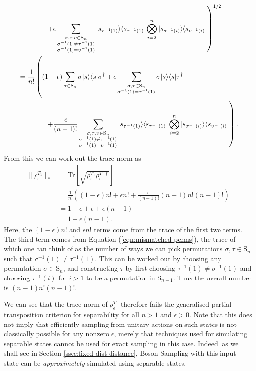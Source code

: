 \begin{align}
&\quad\quad\quad\quad\left.+ \epsilon\sum_{\substack{\sigma,\tau,\upsilon \in \textrm{S}_n\\\sigma^{-1}(1) \neq \tau^{-1}(1)\\\sigma^{-1}(1) = \upsilon^{-1}(1)}}|s_{\tau^{-1}(1)}\rangle\langle s_{\tau^{-1}(1)}|\bigotimes_{i=2}^n|s_{\sigma^{-1}(i)}\rangle\langle s_{\upsilon^{-1}(i)}|\right)^{1/2} \\
&= \frac{1}{n!}\left(\vphantom{\sum_{\substack{a\\b\\c\\d}}}(1-\epsilon)\sum_{\sigma\in \textrm{S}_n}\sigma|s\rangle\langle s|\sigma^\dagger + \epsilon\sum_{\substack{\sigma,\tau \in \textrm{S}_n\\\sigma^{-1}(1) = \tau^{-1}(1)}}\sigma|s\rangle\langle s|\tau^\dagger\right.\nonumber\\
&\quad\quad\quad\quad\left.+\frac{\epsilon}{(n-1)!}\sum_{\substack{\sigma,\tau,\upsilon \in \textrm{S}_n\\\sigma^{-1}(1) \neq \tau^{-1}(1)\\\sigma^{-1}(1) = \upsilon^{-1}(1)}}|s_{\tau^{-1}(1)}\rangle\langle s_{\tau^{-1}(1)}|\bigotimes_{i=2}^n|s_{\sigma^{-1}(i)}\rangle\langle s_{\upsilon^{-1}(i)}|\right).\label{eqn:mismatched-perms}
\end{align}
From this we can work out the trace norm as
\begin{align}
\|\rho_{\epsilon}^{T_1}\|_*
 &= \textrm{Tr}\left[\sqrt{\rho_\epsilon^{T_1}\rho_\epsilon^{T_1\dagger}}\right]\\
 &= \frac{1}{n!}\left((1-\epsilon)n! + \epsilon n! + \frac{\epsilon}{(n-1)!}(n-1)n!(n-1)!\right)\\
 &= 1-\epsilon + \epsilon+\epsilon(n-1)\\
 &= 1+\epsilon(n-1).
\end{align}
Here, the $(1-\epsilon)n!$ and $\epsilon n!$ terms come from the trace of the first two terms. 
The third term comes from Equation (\ref{eqn:mismatched-perms}), the trace of which one can think of as the number of ways we can pick permutations $\sigma,\tau\in\textrm{S}_n$ such that $\sigma^{-1}(1)\neq\tau^{-1}(1)$. 
This can be worked out by choosing any permutation $\sigma \in \textrm{S}_n$, and constructing $\tau$ by first choosing $\tau^{-1}(1)\neq\sigma^{-1}(1)$ and choosing $\tau^{-1}(i)$ for $i>1$ to be a permutation in $\textrm{S}_{n-1}$. 
Thus the overall number is $(n-1)n!(n-1)!$.

We can see that the trace norm of $\rho_\epsilon^{T_1}$ therefore fails the generalised partial transposition criterion for separability for all $n>1$ and $\epsilon>0$.
Note that this does not imply that efficiently sampling from unitary actions on such states is not classically possible for any nonzero $\epsilon$, merely that techniques used for simulating separable states cannot be used for exact sampling in this case. Indeed, as we shall see in Section \ref{ssec:fixed-dist-distance}, Boson Sampling with this input state can be \textit{approximately} simulated using separable states.

